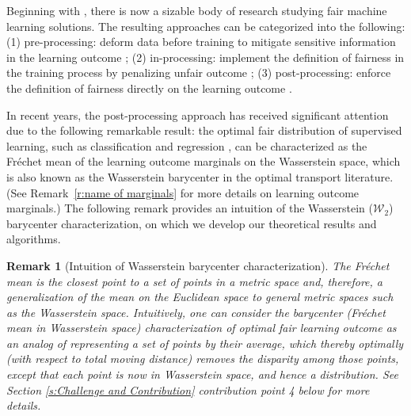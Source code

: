 \documentclass[twoside,11pt]{article}
\newtheorem{rema}{Remark}[section]{\bfseries}{\itshape}
\newcommand{\edit}[1]{\textcolor{blue}{#1}}
\newcommand{\ts}[1]{\textcolor{red}{[#1]}}
\begin{document}
Beginning with \cite{dwork2012fairness}, there is now a sizable body of research studying fair machine learning solutions. The resulting approaches can be categorized into the following: (1) pre-processing: deform data before training to mitigate sensitive information in the learning outcome \cite{calmon2017optimized, kamiran2012data}; (2) in-processing: implement the definition of fairness in the training process by penalizing unfair outcome \cite{berk2017convex, zafar2017fairness}; (3) post-processing: enforce the definition of fairness directly on the learning outcome \cite{hardt2016equality, jiang2020wasserstein}.

In recent years, the post-processing approach has received significant attention due to the following remarkable result: the optimal fair distribution of supervised learning, such as classification \cite{jiang2020wasserstein} and regression \cite{chzhen2020fair, gouic2020projection}, can be characterized as the Fr\'echet mean of the learning outcome marginals on the Wasserstein space, which is also known as the Wasserstein barycenter in the optimal transport literature. (See Remark~\ref{r:name of marginals} for more details on learning outcome marginals.) The following remark provides an intuition of the Wasserstein ($\mathcal{W}_2$) barycenter characterization, on which we develop our theoretical results and algorithms.

\begin{rema}[Intuition of Wasserstein barycenter characterization]\label{r:Intuition of Wasserstein Barycenter Characterization}
The Fr\'echet mean is the closest point to a set of points in a metric space and, therefore, a generalization of the mean on the Euclidean space to general metric spaces such as the Wasserstein space. Intuitively, one can consider the barycenter (Fr\'echet mean in Wasserstein space) characterization of optimal fair learning outcome as an analog of representing a set of points by their average, which thereby optimally (with respect to total moving distance) removes the disparity among those points, except that each point is now in Wasserstein space, and hence a distribution. 
See Section \ref{s:Challenge and Contribution} contribution point 4 below for more details.
\end{rema}
\end{document}
